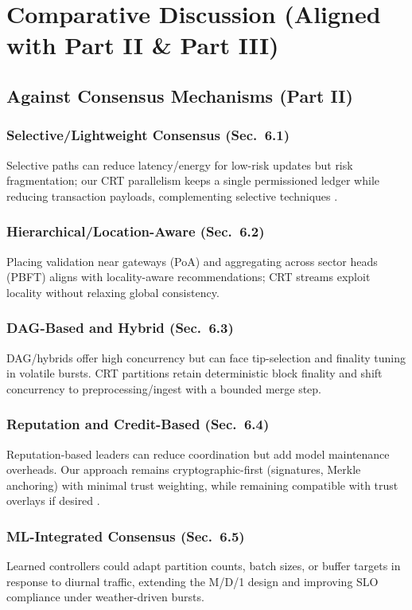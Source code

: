 \section{Comparative Discussion (Aligned with Part II \& Part III)}

\subsection{Against Consensus Mechanisms (Part II)}
\subsubsection{Selective/Lightweight Consensus (Sec.~6.1)}
Selective paths can reduce latency/energy for low-risk updates but risk fragmentation; our CRT parallelism keeps a single permissioned ledger while reducing transaction payloads, complementing selective techniques \cite{ali2022blockchainenabledarchitecture}.

\subsubsection{Hierarchical/Location-Aware (Sec.~6.2)}
Placing validation near gateways (PoA) and aggregating across sector heads (PBFT) aligns with locality-aware recommendations; CRT streams exploit locality without relaxing global consistency.

\subsubsection{DAG-Based and Hybrid (Sec.~6.3)}
DAG/hybrids offer high concurrency but can face tip-selection and finality tuning in volatile bursts. CRT partitions retain deterministic block finality and shift concurrency to preprocessing/ingest with a bounded merge step.

\subsubsection{Reputation and Credit-Based (Sec.~6.4)}
Reputation-based leaders can reduce coordination but add model maintenance overheads. Our approach remains cryptographic-first (signatures, Merkle anchoring) with minimal trust weighting, while remaining compatible with trust overlays if desired \cite{morais2023surveyonintegration}.

\subsubsection{ML-Integrated Consensus (Sec.~6.5)}
Learned controllers could adapt partition counts, batch sizes, or buffer targets in response to diurnal traffic, extending the M/D/1 design and improving SLO compliance under weather-driven bursts. %

